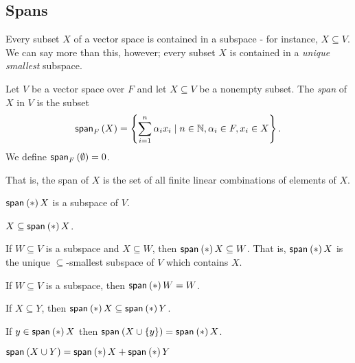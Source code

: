 \documentclass{memoir}
\begin{document}
\setcounter{section}{6}

\subsection*{Spans}

Every subset $X$ of a vector space is contained in a subspace - for instance, $X \subseteq V$. We can say more than this, however; every subset $X$ is contained in a \emph{unique smallest} subspace.

\begin{dfn}
Let $V$ be a vector space over $F$ and let $X \subseteq V$ be a nonempty subset. The \emph{span} of $X$ in $V$ is the subset \[ \Span[F]{X} = \left\{ \sum_{i=1}^n \alpha_i x_i \mid n \in \mathbb{N}, \alpha_i \in F, x_i \in X \right\}. \] We define $\Span[F]{\emptyset} = 0$.
\end{dfn}

That is, the span of $X$ is the set of all finite linear combinations of elements of $X$.

\begin{prp} \mbox{}
\begin{enumerate*}
\item $\Span*{X}$ is a subspace of $V$.
\item $X \subseteq \Span*{X}$.
\item If $W \subseteq V$ is a subspace and $X \subseteq W$, then $\Span*{X} \subseteq W$. That is, $\Span*{X}$ is the unique $\subseteq$-smallest subspace of $V$ which contains $X$.
\item If $W \subseteq V$ is a subspace, then $\Span*{W} = W$.
\item If $X \subseteq Y$, then $\Span*{X} \subseteq \Span*{Y}$.
\item If $y \in \Span*{X}$ then $\Span{X \cup \{y\}} = \Span*{X}$.
\item $\Span{X \cup Y} = \Span*{X} + \Span*{Y}$
\end{enumerate*}
\end{prp}
\end{document}
